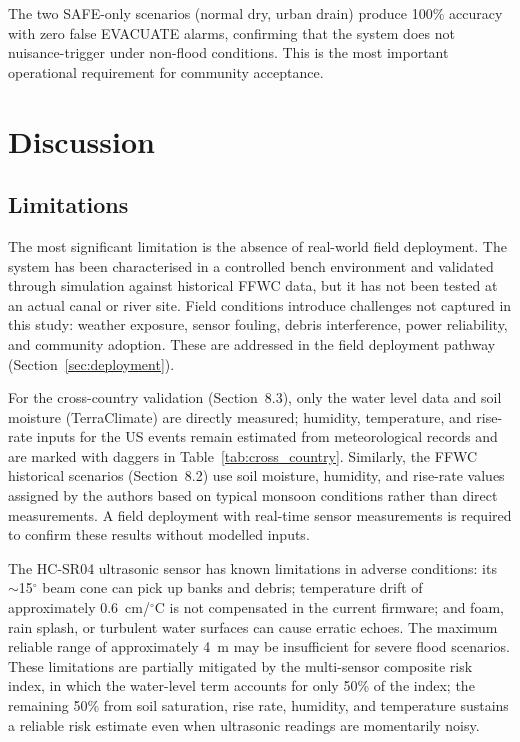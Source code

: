 \documentclass[5p,twocolumn]{elsarticle}
\begin{document}
The two SAFE-only scenarios (normal dry, urban drain) produce 100\% accuracy with zero false EVACUATE alarms, confirming that the system does not nuisance-trigger under non-flood conditions. This is the most important operational requirement for community acceptance.

\section{Discussion}

\subsection{Limitations}

The most significant limitation is the absence of real-world field deployment. The system has been characterised in a controlled bench environment and validated through simulation against historical FFWC data, but it has not been tested at an actual canal or river site. Field conditions introduce challenges not captured in this study: weather exposure, sensor fouling, debris interference, power reliability, and community adoption. These are addressed in the field deployment pathway (Section~\ref{sec:deployment}). 

For the cross-country validation (Section~8.3), only the water level data and soil moisture (TerraClimate) are directly measured; humidity, temperature, and rise-rate inputs for the US events remain estimated from meteorological records and are marked with daggers in Table~\ref{tab:cross_country}. Similarly, the FFWC historical scenarios (Section~8.2) use soil moisture, humidity, and rise-rate values assigned by the authors based on typical monsoon conditions rather than direct measurements. A field deployment with real-time sensor measurements is required to confirm these results without modelled inputs.

The HC-SR04 ultrasonic sensor has known limitations in adverse conditions: its $\sim$15$^\circ$ beam cone can pick up banks and debris; temperature drift of approximately 0.6~cm/$^\circ$C is not compensated in the current firmware; and foam, rain splash, or turbulent water surfaces can cause erratic echoes. The maximum reliable range of approximately 4~m may be insufficient for severe flood scenarios. These limitations are partially mitigated by the multi-sensor composite risk index, in which the water-level term accounts for only 50\% of the index; the remaining 50\% from soil saturation, rise rate, humidity, and temperature sustains a reliable risk estimate even when ultrasonic readings are momentarily noisy.
\end{document}

